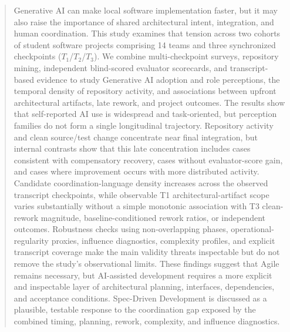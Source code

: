 \begin{abstract}
Generative AI can make local software implementation faster, but it may also
raise the importance of shared architectural intent, integration, and human
coordination. This study examines that tension across two cohorts of student
software projects comprising 14 teams and three synchronized checkpoints
($T_1$/$T_2$/$T_3$). We combine multi-checkpoint surveys, repository mining,
independent blind-scored evaluator scorecards, and transcript-based evidence to
study Generative AI adoption and role perceptions, the temporal density of
repository activity, and associations between upfront architectural artifacts,
late rework, and project outcomes. The results show that self-reported AI use
is widespread and task-oriented, but perception families do not form a single
longitudinal trajectory. Repository activity and clean source/test change
concentrate near final integration, but internal contrasts show that this late
concentration includes cases consistent with compensatory recovery, cases
without evaluator-score gain, and cases where improvement occurs with more
distributed activity. Candidate coordination-language density increases across
the observed transcript checkpoints, while observable T1 architectural-artifact
scope varies substantially without a simple monotonic association with T3
clean-rework magnitude, baseline-conditioned rework ratios, or independent
outcomes. Robustness checks using non-overlapping phases,
operational-regularity proxies, influence diagnostics, complexity profiles, and
explicit transcript coverage make the main validity threats inspectable but do
not remove the study's observational limits. These findings suggest that Agile
remains necessary, but AI-assisted development requires a more explicit and
inspectable layer of architectural planning, interfaces, dependencies, and
acceptance conditions. Spec-Driven Development is discussed as a plausible,
testable response to the coordination gap exposed by the combined timing,
planning, rework, complexity, and influence diagnostics.
\end{abstract}
